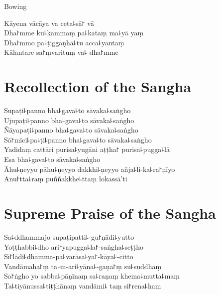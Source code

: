 \clearpage

\begin{instruction}%
  Bowing
\end{instruction}

Kāyena vācāya va ceta꜕sā꜓ vā\\
Dha꜓mme ku꜕kammaṃ pa꜕kataṃ ma꜕yā yaṃ\\
Dha꜓mmo pa꜕ṭiggaṇhā꜕tu acca꜕yantaṃ\\
Kālantare sa꜓ṃvarituṃ va꜕ dha꜓mme

\chPali
\chapter{Recollection of the Sangha}%

\begin{leader}
\end{leader}

Supaṭi꜕panno bha꜕gava꜕to sāvaka꜕saṅgho\\
Ujupaṭi꜕panno bha꜕gava꜕to sāvaka꜕saṅgho\\
Ñāyapaṭi꜕panno bha꜕gava꜕to sāvaka꜕saṅgho\\
Sā꜓mīci꜕pa꜕ṭi꜕panno bha꜕gava꜕to sāvaka꜕saṅgho\\
Yadidaṃ cattāri purisa꜕yugāni aṭṭha꜓ purisa꜕pugga꜕lā\\
Esa bha꜕gava꜕to sāvaka꜕saṅgho\\
Āhu꜕ṇeyyo pāhu꜕ṇeyyo dakkhi꜕ṇeyyo añja꜕li-ka꜕ra꜓ṇīyo\\
Anu꜓tta꜕raṃ puññakkhe꜕ttaṃ lokassā'ti

\chPali
\chapter{Supreme Praise of the Sangha}%

\begin{leader}
\end{leader}

Sa꜕ddhammajo supaṭipatti꜕-gu꜓ṇādi꜕yutto\\
Yoṭṭhabbi꜕dho ari꜓yapugga꜕la꜓-saṅgha꜕seṭṭho\\
Sī꜓lādi꜕dhamma-pa꜕varāsa꜕ya꜓-kāya꜕-citto\\
Vandāmaha꜓ṃ ta꜕m-ari꜕yāna꜕-gaṇa꜓ṃ su꜕suddhaṃ\\
Sa꜓ṅgho yo sabba꜕pāṇīnaṃ sa꜕raṇaṃ khema꜕mutta꜕maṃ\\
Ta꜕tiyānussa꜕tiṭṭhānaṃ vandāmi꜕ taṃ si꜓rena꜕haṃ

